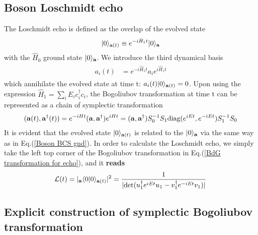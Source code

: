 \subsection{Boson Loschmidt echo}

The Loschmidt echo is defined as the overlap of the evolved state
\begin{eqnarray}\begin{aligned}
|0\rangle_{{\bf a}(t)}\equiv e^{-i\hat{H}_1t}|0\rangle_{\bf a}
\end{aligned}\end{eqnarray}
with the $\hat{H}_0$ ground state $|0\rangle_{\bf a}$. We introduce the third dynamical basis
\begin{eqnarray}\begin{aligned}
a_i(t)&=e^{-i\hat{H}_1t}a_ie^{i\hat{H}_1t}
\end{aligned}\end{eqnarray}
which annihilate the evolved state at time t: $a_i(t)|0\rangle_{{\bf a}(t)}=0$. Upon using the expression $\hat{H}_1=\sum_iE_ic_i^\dagger c_i$, the Bogoliubov transformation at time t can be represented as a chain of symplectic transformation
\begin{eqnarray}\begin{aligned}
\label{BdG transformation for echo}
({\bf a}(t),{\bf a}^\dagger(t))=e^{-iHt}
({\bf a} , {\bf a}^\dagger)e^{iHt}=({\bf a},{\bf a}^\dagger)S_0^{-1}S_1\text{diag}(e^{iEt},e^{-iEt})S_1^{-1}S_0
\end{aligned}\end{eqnarray}
It is evident that the evolved state $|0\rangle_{{\bf a}(t)}$ is related to the $|0\rangle_{{\bf a}}$ via the same way as in Eq.(\ref{Boson BCS gnd}). In order to calculate the Loschmidt echo, we simply take the left top corner of the Bogoliubov transformation in Eq.(\ref{BdG transformation for echo}), and it {\bf\color{red}reads}
\begin{eqnarray}\begin{aligned}
\mathcal{L}(t)=|_{\bf a}\langle0|0\rangle_{{\bf a}(t)}|^2=\frac{1}{|\text{det}(u_1^\dagger e^{iEt}u_1-v_1^\dagger e^{-iEt}v_1)|}
\end{aligned}\end{eqnarray}

\subsection{Explicit construction of symplectic Bogoliubov transformation}

